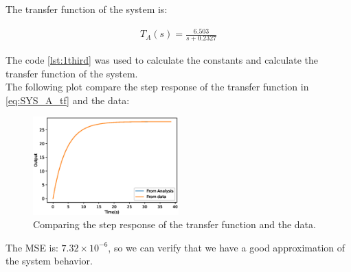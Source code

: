 \documentclass[a4paper]{article}
\begin{document}
The transfer function of the system is:

\begin{align}
	\label{eq:SYS_A_tf}	
	T_A(s) = \frac{6.503}{s + 0.2327}
\end{align}

The code \ref{lst:1third} was used to calculate the constants and calculate the transfer function of the system.\\
 
The following plot compare the step response of the transfer function in \ref{eq:SYS_A_tf} and the data:  
\begin{figure}[H]
    \centering
    \includegraphics[width=0.5\textwidth]{Figures/Question1/EXE_1_COMPARE_SYS_A.eps}
    \caption{Comparing the step response of the transfer function and the data.}
    \label{fig:SYS_A_COMPARE_PLOT}
\end{figure}
The MSE is: $7.32\times 10^{-6}$, so we can verify that we have a good approximation of the system behavior. 
\end{document}
